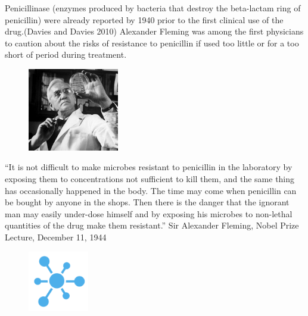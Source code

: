 \documentclass[
  letterpaper,
  DIV=11,
  numbers=noendperiod]{scrreprt}
\begin{document}
Penicillinase (enzymes produced by bacteria that destroy the beta-lactam
ring of penicillin) were already reported by 1940 prior to the first
clinical use of the drug.(Davies and Davies 2010) Alexander Fleming was
among the first physicians to caution about the risks of resistance to
penicillin if used too little or for a too short of period during
treatment.

\begin{tcolorbox}[enhanced jigsaw, breakable, left=2mm, arc=.35mm, toprule=.15mm, colback=white, leftrule=.75mm, opacityback=0, rightrule=.15mm, bottomrule=.15mm]

\begin{figure}[H]

{\centering \includegraphics[width=1.5625in,height=\textheight]{images/alexflemming.jpeg}

}

\end{figure}

``It is not difficult to make microbes resistant to penicillin in the
laboratory by exposing them to concentrations not sufficient to kill
them, and the same thing has occasionally happened in the body. The time
may come when penicillin can be bought by anyone in the shops. Then
there is the danger that the ignorant man may easily under-dose himself
and by exposing his microbes to non-lethal quantities of the drug make
them resistant.'' Sir Alexander Fleming, Nobel Prize Lecture, December
11, 1944

\end{tcolorbox}

\begin{figure}

{\centering \includegraphics[width=1.04167in,height=\textheight]{images/breakblue.png}

}

\end{figure}
\end{document}
